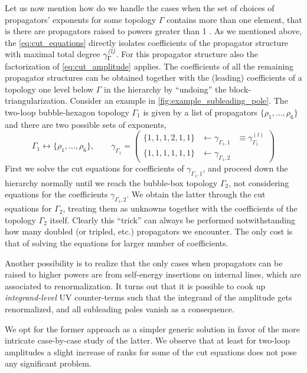 {Let us now mention how do we handle
the cases when the set of choices of propagators' exponents for some topology $\Gamma$
contains more than one element, that is there are propagators raised to powers greater than 1 \cite{Abreu:2017idw}.
As we mentioned above, the \cref{eq:cut_equations} directly isolates coefficients of 
the propagator structure with maximal total degree ${\gamma^{\textit{(l)}}_{\Gamma}}$. For this propagator structure
also the factorization of \cref{eq:cut_amplitude} applies.
The coefficients of all the remaining propagator structures can be obtained together with the (leading) coefficients  of a topology one level below
$\Gamma$ in the hierarchy by ``undoing'' the block-triangularization.
Consider an example in \cref{fig:example_subleading_pole}.
The two-loop bubble-hexagon topology $\Gamma_1$ is given by a list of propagators $\{\rho_1,\ldots{},\rho_6\}$ and there are two
possible sets of exponents,
\[
  \Gamma_1 \leftrightarrow  \{\rho_1,\ldots{},\rho_6\}, \qquad \gamma_{\Gamma_1} =  
  \begin{pmatrix} 
    \{1,1,1,2,1,1\} &\leftarrow \gamma_{{\Gamma_1},1}  & \equiv \gamma_{\Gamma_1}^{(\textit{l})} \\ 
    \{1,1,1,1,1,1\} &\leftarrow \gamma_{{\Gamma_1},2} &
  \end{pmatrix}
\]
First we solve the cut equations for coefficients of $\gamma_{{\Gamma_1},1}$, and proceed down the hierarchy normally until we reach
the bubble-box topology $\Gamma_2$, not considering equations for the coefficients $\gamma_{{\Gamma_1},2}$.
We obtain the latter through the cut equations for $\Gamma_2$, treating them as unknowns together with 
the coefficients of the topology $\Gamma_2$ itself. Clearly this ``trick'' can always be performed
notwithstanding how many doubled (or tripled, etc.\@) propagators we encounter.
The only cost is that of solving the equations for larger number of coefficients.

Another possibility is to realize that the only cases when propagators can be raised to higher powers 
are from self-energy insertions on internal lines, which are associated to renormalization.
It turns out \cite{Baumeister:2019rmh} that
it is possible to cook up \emph{integrand-level} UV counter-terms such that
the integrand of the amplitude gets renormalized,
and all subleading poles vanish as a consequence.

We opt for the former approach as a simpler generic solution in favor of the
more intricate case-by-case study of the latter.
We observe that at least for two-loop
amplitudes a slight increase of ranks for some of the cut equations does not
pose any significant problem.

}
